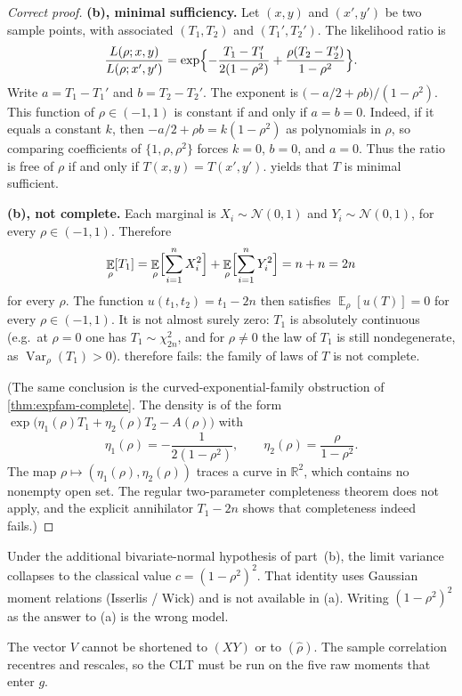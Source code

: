 \documentclass[11pt,a4paper]{article}
\DeclareMathOperator{\Var}{Var}
\DeclareMathOperator{\E}{\mathbb{E}}
\begin{document}
\begin{proof}[Correct proof]
\textbf{(b), minimal sufficiency.}
Let \( (x,y) \) and \( (x',y') \) be two sample points, with associated \( (T_1,T_2) \) and \( (T_1',T_2') \). The likelihood ratio is
\[
\frac{L(\rho;x,y)}{L(\rho;x',y')}
=
\exp\Bigl\{
-\frac{T_1-T_1'}{2(1-\rho^{2})}
+
\frac{\rho(T_2-T_2')}{1-\rho^{2}}
\Bigr\}.
\]
Write \( a=T_1-T_1' \) and \( b=T_2-T_2' \). The exponent is \( \bigl(-a/2+\rho b\bigr)/(1-\rho^{2}) \). This function of \( \rho\in(-1,1) \) is constant if and only if \( a=b=0 \). Indeed, if it equals a constant \( k \), then \( -a/2+\rho b=k(1-\rho^{2}) \) as polynomials in \( \rho \), so comparing coefficients of \( \{1,\rho,\rho^{2}\} \) forces \( k=0 \), \( b=0 \), and \( a=0 \). Thus the ratio is free of \( \rho \) if and only if \( T(x,y)=T(x',y') \).  yields that \( T \) is minimal sufficient.

\textbf{(b), not complete.}
Each marginal is \( X_i\sim\mathcal{N}(0,1) \) and \( Y_i\sim\mathcal{N}(0,1) \), for every \( \rho\in(-1,1) \). Therefore
\[
\E_\rho[T_1]
=
\E_\rho\Bigl[\sum_{i=1}^{n}X_i^{2}\Bigr]
+
\E_\rho\Bigl[\sum_{i=1}^{n}Y_i^{2}\Bigr]
=
n+n
=
2n
\]
for every \( \rho \). The function \( u(t_1,t_2)=t_1-2n \) then satisfies \( \E_\rho[u(T)]=0 \) for every \( \rho\in(-1,1) \). It is not almost surely zero: \( T_1 \) is absolutely continuous (e.g.\ at \( \rho=0 \) one has \( T_1\sim\chi^{2}_{2n} \), and for \( \rho\neq 0 \) the law of \( T_1 \) is still nondegenerate, as \( \Var_\rho(T_1)>0 \)).  therefore fails: the family of laws of \( T \) is not complete.

(The same conclusion is the curved-exponential-family obstruction of \cref{thm:expfam-complete}. The density is of the form \( \exp\bigl(\eta_1(\rho)T_1+\eta_2(\rho)T_2-A(\rho)\bigr) \) with
\[
\eta_1(\rho)
=
-\frac{1}{2(1-\rho^{2})},
\qquad
\eta_2(\rho)
=
\frac{\rho}{1-\rho^{2}}.
\]
The map \( \rho\mapsto(\eta_1(\rho),\eta_2(\rho)) \) traces a curve in \( \mathbb{R}^{2} \), which contains no nonempty open set. The regular two-parameter completeness theorem does not apply, and the explicit annihilator \( T_1-2n \) shows that completeness indeed fails.)
\end{proof}

\begin{remark}
\label{rem:p9-normal-var}
Under the additional bivariate-normal hypothesis of part~(b), the limit variance collapses to the classical value \( c=(1-\rho^{2})^{2} \). That identity uses Gaussian moment relations (Isserlis / Wick) and is not available in (a). Writing \( (1-\rho^{2})^{2} \) as the answer to (a) is the wrong model.

The vector \( V \) cannot be shortened to \( (XY) \) or to \( (\hat{\rho}) \). The sample correlation recentres and rescales, so the CLT must be run on the five raw moments that enter \( g \).
\end{remark}
\end{document}
